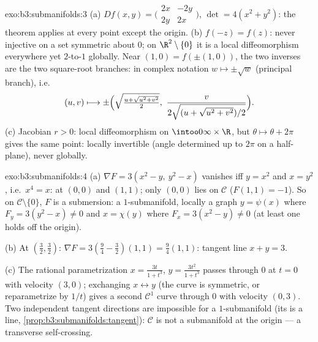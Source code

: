 \begin{solution}{exo:b3:submanifolds:3}
(a) $Df(x,y) = \bigl(\begin{smallmatrix}2x & -2y\\ 2y &
2x\end{smallmatrix}\bigr)$, $\det = 4(x^2 + y^2)$: the
theorem applies at every point except the origin.
(b) $f(-z) = f(z)$: never injective on a set symmetric about
$0$; on $\R^2\setminus\{0\}$ it is a local diffeomorphism
everywhere yet $2$-to-$1$ globally. Near $(1, 0) = f(\pm(1,
0))$, the two inverses are the two square-root branches: in
complex notation $w \mapsto \pm\sqrt w$ (principal branch),
i.e.
\[
(u, v) \longmapsto \pm\Bigl(\sqrt{\tfrac{u +
\sqrt{u^2+v^2}}{2}},\ \frac{v}{2\sqrt{(u +
\sqrt{u^2+v^2})/2}}\Bigr).
\]
(c) Jacobian $r > 0$: local diffeomorphism on
$\intoo0\infty\times\R$, but $\theta \mapsto \theta + 2\pi$
gives the same point: locally invertible (angle determined up
to $2\pi$ on a half-plane), never globally.
\end{solution}

\begin{solution}{exo:b3:submanifolds:4}
(a) $\nabla F = 3(x^2 - y,\ y^2 - x)$ vanishes iff $y = x^2$
and $x = y^2$, i.e.\ $x^4 = x$: at $(0,0)$ and $(1,1)$; only
$(0,0)$ lies on $\mathcal C$ ($F(1,1) = -1$). So on $\mathcal
C\setminus\{0\}$, $F$ is a submersion: a $1$-submanifold,
locally a graph $y = \psi(x)$ where $F_y = 3(y^2 - x) \neq 0$
and $x = \chi(y)$ where $F_x = 3(x^2 - y) \neq 0$ (at least
one holds off the origin).

(b) At $(\frac32, \frac32)$: $\nabla F = 3(\frac94 - \frac32)
(1, 1) = \frac94(1,1)$: tangent line $x + y = 3$.

(c) The rational parametrization $x = \frac{3t}{1 + t^3}$,
$y = \frac{3t^2}{1+t^3}$ passes through $0$ at $t = 0$ with
velocity $(3, 0)$; exchanging $x \leftrightarrow y$ (the
curve is symmetric, or reparametrize by $1/t$) gives a second
$\mathcal C^1$ curve through $0$ with velocity $(0, 3)$. Two
independent tangent directions are impossible for a
$1$-submanifold (its  is a line,
\cref{prop:b3:submanifolds:tangent}): $\mathcal C$ is not a
submanifold at the origin --- a transverse self-crossing.
\end{solution}

